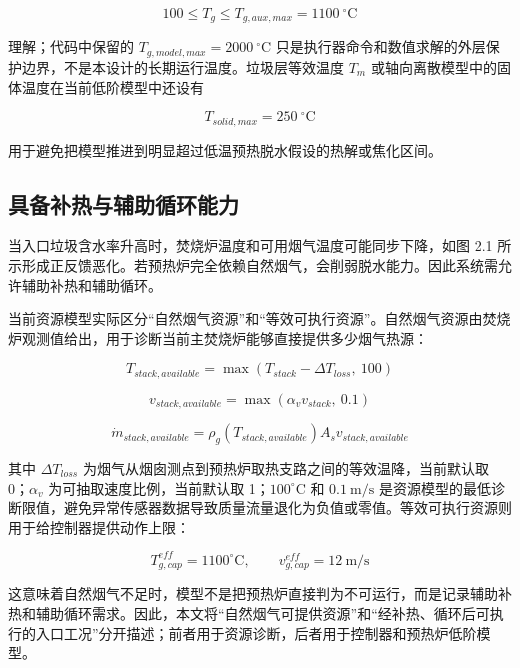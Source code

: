\documentclass[UTF8,openany,zihao=-4,oneside]{ctexbook}
\begin{document}
\[
100\le T_g\le T_{g,aux,max}=1100\ ^\circ\mathrm{C}
\]

理解；代码中保留的 \(T_{g,model,max}=2000\ ^\circ\mathrm{C}\) 只是执行器命令和数值求解的外层保护边界，不是本设计的长期运行温度。垃圾层等效温度 \(T_m\) 或轴向离散模型中的固体温度在当前低阶模型中还设有

\[
T_{solid,max}=250\ ^\circ\mathrm{C}
\]

用于避免把模型推进到明显超过低温预热脱水假设的热解或焦化区间。

\subsection{具备补热与辅助循环能力}\label{ux5177ux5907ux8865ux70edux4e0eux8f85ux52a9ux5faaux73afux80fdux529b}

当入口垃圾含水率升高时，焚烧炉温度和可用烟气温度可能同步下降，如图 2.1 所示形成正反馈恶化。若预热炉完全依赖自然烟气，会削弱脱水能力。因此系统需允许辅助补热和辅助循环。

当前资源模型实际区分“自然烟气资源”和“等效可执行资源”。自然烟气资源由焚烧炉观测值给出，用于诊断当前主焚烧炉能够直接提供多少烟气热源：

\[
T_{stack,available}=\max(T_{stack}-\Delta T_{loss},\ 100)
\]

\[
v_{stack,available}=\max(\alpha_v v_{stack},\ 0.1)
\]

\[
\dot m_{stack,available}=\rho_g(T_{stack,available})A_s v_{stack,available}
\]

其中 \(\Delta T_{loss}\) 为烟气从烟囱测点到预热炉取热支路之间的等效温降，当前默认取 0；\(\alpha_v\) 为可抽取速度比例，当前默认取 1；\(100^\circ\mathrm{C}\) 和 \(0.1\ \mathrm{m/s}\) 是资源模型的最低诊断限值，避免异常传感器数据导致质量流量退化为负值或零值。等效可执行资源则用于给控制器提供动作上限：

\[
T_{g,cap}^{eff}=1100^\circ\mathrm{C},\qquad v_{g,cap}^{eff}=12\ \mathrm{m/s}
\]

这意味着自然烟气不足时，模型不是把预热炉直接判为不可运行，而是记录辅助补热和辅助循环需求。因此，本文将“自然烟气可提供资源”和“经补热、循环后可执行的入口工况”分开描述；前者用于资源诊断，后者用于控制器和预热炉低阶模型。
\end{document}
